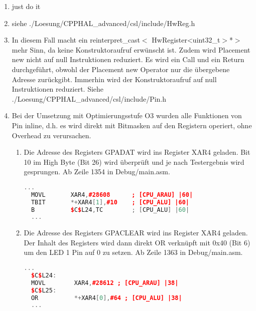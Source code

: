 \begin{enumerate}
  \item  just do it
\item  siehe ./Loesung/CPPHAL\_advanced/csl/include/HwReg.h



\item In diesem Fall macht ein reinterpret\_cast$<$ HwRegister<uint32\_t$>$*$>$ mehr Sinn, da keine Konstruktoraufruf erwünscht ist. Zudem wird Placement new nicht auf null Instruktionen reduziert. Es wird ein Call und ein Return durchgeführt, obwohl der Placement new Operator nur die übergebene Adresse zurückgibt. Immerhin wird der Konstruktoraufruf auf null Instruktionen reduziert.
Siehe ./Loesung/CPPHAL\_advanced/csl/include/Pin.h

\item Bei der Umsetzung mit Optimierungsstufe O3 wurden alle Funktionen von Pin inline, d.h. es wird direkt mit Bitmasken auf den Registern operiert, ohne Overhead zu verursachen.
\begin{enumerate}
  \item Die Adresse des Registers GPADAT wird ins Register XAR4 geladen. Bit 10 im High Byte (Bit 26) wird überprüft und je nach Testergebnis wird gesprungen. Ab Zeile 1354 in Debug/main.asm.
  \begin{lstlisting}[language=C++, style=C++]
  ...
  MOVL       XAR4,#28608      ; [CPU_ARAU] |60|
  TBIT       *+XAR4[1],#10    ; [CPU_ALU] |60|
  B          $C$L24,TC        ; [CPU_ALU] |60|
  ...
  \end{lstlisting}
  \item Die Adresse des Registers GPACLEAR wird ins Register XAR4 geladen. Der Inhalt des Registers wird dann direkt OR verknüpft mit 0x40 (Bit 6) um den LED 1 Pin auf 0 zu setzen. Ab Zeile 1363 in Debug/main.asm.
  \begin{lstlisting}[language=C++, style=C++]
  ...
  $C$L24:
  MOVL        XAR4,#28612 ; [CPU_ARAU] |38|
  $C$L25:
  OR          *+XAR4[0],#64 ; [CPU_ALU] |38|
  ...
  \end{lstlisting}

\end{enumerate}
\end{enumerate}
